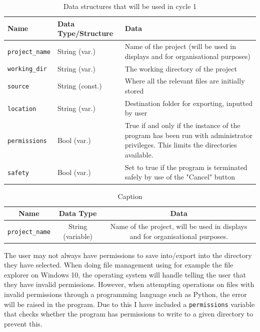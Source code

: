 \documentclass[11pt]{article}
\newcommand{\ra}[1]{\renewcommand{\arraystretch}{#1}}
\begin{document}
                \begin{table}[!ht]
                    \centering
                    \begin{tabular}{llm{}}
                        Name & Data Type/Structure & Data \\ \hline
                        \verb|project_name| & String (var.) & Name of the project (will be used in displays and for organisational purposes) \\
                        \verb|working_dir| & String (var.) & The working directory of the project \\
                        \verb|source| & String (const.) & Where all the relevant files are initially stored \\
                        \verb|location| & String (var.) & Destination folder for exporting, inputted by user \\
                        \verb|permissions| & Bool (var.) & True if and only if the instance of the program has been run with administrator privileges. This limits the directories available. \\
                        \verb|safety| & Bool (var.) & Set to true if the program is terminated safely by use of the "Cancel" button
                    \end{tabular}
                    \caption{Data structures that will be used in cycle 1}
                    \label{tbl:data_structs_c1}
                \end{table}

                \begin{table}\centering
                    \ra{1.3}
                    \begin{tabularx}{\textwidth}{@{}ccc@{}}\toprule
                    Name & Data Type & Data \\ \midrule
                    \verb|project_name| & String (variable) & Name of the project, will be used in displays and for organisational purposes.\\
                    \bottomrule
                    \end{tabularx}
                    \caption{Caption}
                \end{table}

                The user may not always have permissions to save into/export into the directory they have selected. When doing file management using for example the file explorer on Windows 10, the operating system will handle telling the user that they have invalid permissions. However, when attempting operations on files with invalid permissions through a programming language such as Python, the error will be raised in the program. Due to this I have included a \verb|permissions| variable that checks whether the program has permissions to write to a given directory to prevent this.
\end{document}
